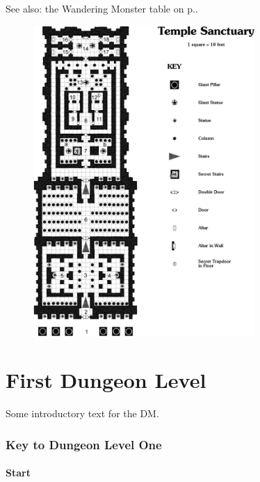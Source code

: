 \documentclass[a4paper,serif]{module}       %
\begin{document}
\noindent See also: the Wandering Monster table on p.\pageref{wanderingmonsters}.



\begin{figure}[p]
\centering
\includegraphics[width=0.75\textwidth]{module_map.png}
\vspace{2em}
\label{img:map}
\end{figure}

\part{First Dungeon Level}

Some introductory text for the DM.

\section*{Key to Dungeon Level One}

\subsection*{Start}
\end{document}
